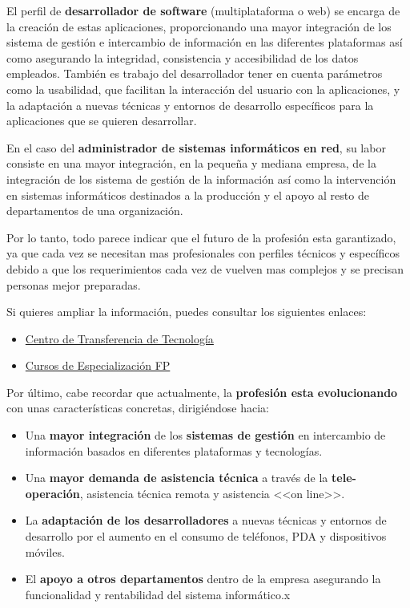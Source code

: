 El perfil de \textbf{desarrollador de software} (multiplataforma o web) se encarga de la creación de estas aplicaciones, proporcionando una mayor integración de los sistema de gestión e intercambio de información en las diferentes plataformas así como asegurando la integridad, consistencia y accesibilidad de los datos empleados. También es trabajo del desarrollador tener en cuenta parámetros como la usabilidad, que facilitan la interacción del usuario con la aplicaciones, y la adaptación a nuevas técnicas y entornos de desarrollo específicos para la aplicaciones que se quieren desarrollar.

En el caso del \textbf{administrador de sistemas informáticos en red}, su labor consiste en una mayor integración, en la pequeña y mediana empresa, de la integración de los sistema de gestión de la información	así como la intervención en sistemas informáticos destinados a la producción y el apoyo al resto de departamentos de una organización.

Por lo tanto, todo parece indicar que el futuro de la profesión esta garantizado, ya que cada vez se necesitan mas profesionales con perfiles técnicos y específicos debido a que los requerimientos cada vez de vuelven mas complejos y se precisan personas mejor preparadas.

Si quieres ampliar la información, puedes consultar los siguientes enlaces:

\begin{itemize}
    \item \href{https://administracionelectronica.gob.es/pae_Home?_nfpb=true&_pageLabel=P1200733131296129097704&langPae=es#faq1}{Centro de Transferencia de Tecnología}
    \item \href{https://educacionadistancia.juntadeandalucia.es/formacionprofesional/mod/scorm/player.php?a=6198&scoid=178876&currentorg=eXe68448_2zip5d5bab14269131fb5c2&mode=&attempt=1}{Cursos de Especialización FP}
\end{itemize}

Por último, cabe recordar que actualmente, la \textbf{profesión esta evolucionando} con unas características concretas, dirigiéndose hacia:

\begin{itemize}
    \item Una \textbf{mayor integración} de los \textbf{sistemas de gestión} en intercambio de información basados en diferentes plataformas y tecnologías.
    \item Una \textbf{mayor demanda de asistencia técnica} a través de la \textbf{tele-operación}, asistencia técnica remota y asistencia <<on line>>.
    \item La \textbf{adaptación de los desarrolladores} a nuevas técnicas y entornos de desarrollo por el aumento en el consumo de teléfonos, PDA y dispositivos móviles.
    \item El\textbf{ apoyo a otros departamentos} dentro de la empresa asegurando la funcionalidad y rentabilidad del sistema informático.x
\end{itemize}


